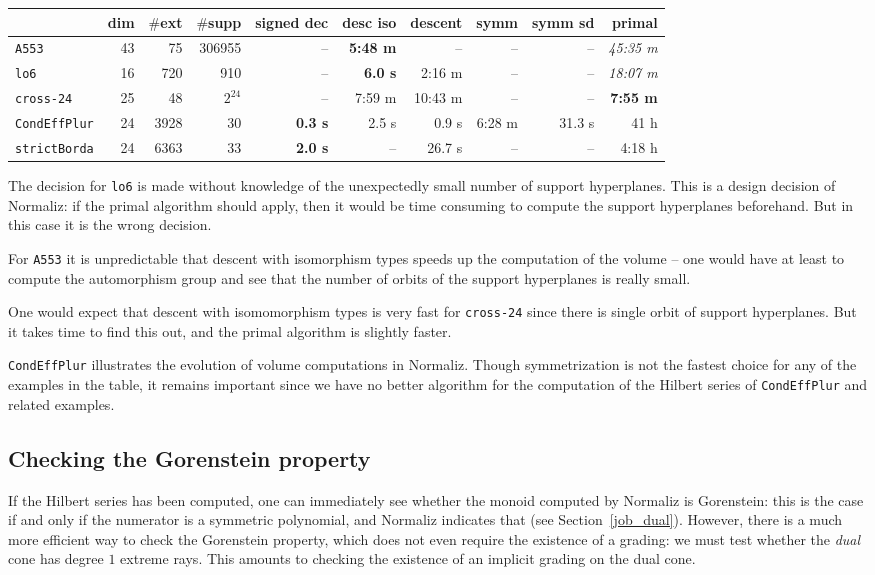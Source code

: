 \documentclass[12pt,a4paper]{scrartcl}
\theoremstyle{definition}
\def\ttt{\texttt}
\begin{document}
\begin{footnotesize}
\begin{tabular}{l|r|r|r|r|r|r|r|r|r|}
& dim & $\#$ext & $\#$supp & signed dec&desc iso&descent& symm & symm sd& primal\\
\hline
\ttt{A553} & 43 &75&306955&--&\textbf{5:48 m}&--&--&--&\emph{45:35 m}\\
\hline
\ttt{lo6}&16&720&910& --   & \textbf{6.0 s}& 2:16 m & -- & --& \emph{18:07 m}\\
\hline
\ttt{cross-24}&25&48&$2^{24}$ & -- & 7:59 m &10:43 m & -- & --& \textbf{7:55 m}\\
\hline
\ttt{CondEffPlur}&24&3928&30& \textbf{0.3 s }&2.5 s & 0.9 s & 6:28 m & 31.3 s & 41 h \\
\hline
\ttt{strictBorda}&24&6363& 33 & \textbf{2.0 s} & -- & 26.7 s& -- & -- & 4:18 h \\
\hline
\end{tabular}
\end{footnotesize}

The decision for \ttt{lo6} is made without knowledge of the unexpectedly small number of support hyperplanes. This is a design decision of Normaliz: if the primal algorithm should apply, then it would be time consuming to compute the support hyperplanes beforehand. But in this case it is the wrong decision. 

For \ttt{A553} it is unpredictable that descent with isomorphism types speeds up the computation of the volume -- one would have at least to compute the automorphism group and see that the number of orbits of the support hyperplanes is really small.

One would expect that descent with isomomorphism types is very fast for \ttt{cross-24} since there is single orbit of support hyperplanes. But it takes time to find this out, and the primal algorithm is slightly faster.

\ttt{CondEffPlur} illustrates the evolution of volume computations in Normaliz. Though symmetrization is not the fastest choice for any of the examples in the table, it remains important since we have no better algorithm for the computation of the Hilbert series of \ttt{CondEffPlur} and related examples.

\subsection{Checking the Gorenstein property}\label{Gorenstein}

If the Hilbert series has been computed, one can immediately see whether the monoid computed by Normaliz is Gorenstein: this is the case if and only if the numerator is a symmetric polynomial, and Normaliz indicates that (see Section~\ref{job_dual}). However, there is a much more efficient way to check the Gorenstein property, which does not even require the existence of a grading: we must test whether the \emph{dual} cone has degree $1$ extreme rays. This amounts to checking the existence of an implicit grading on the dual cone.
\end{document}
